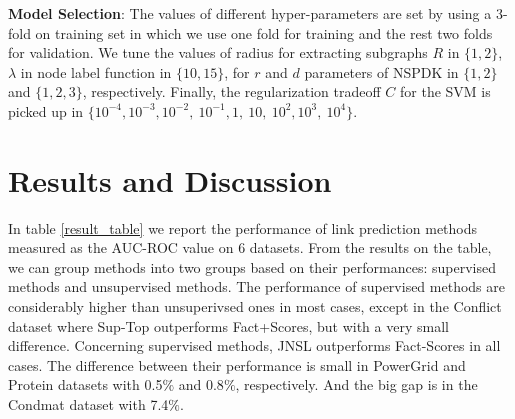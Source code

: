 \documentclass[runningheads,a4paper]{llncs}
\begin{document}
\textbf{Model Selection}: The values of different hyper-parameters are set by using a 3-fold on training set in which we use one fold for training and the rest two folds for validation. We tune the values of radius for extracting subgraphs $R$ in $\lbrace 1, 2 \rbrace$, $\lambda$ in node label function in $\lbrace 10, 15 \rbrace$, for $r$ and $d$ parameters of NSPDK in $\lbrace  1, 2 \rbrace$ and $\lbrace  1, 2, 3 \rbrace$, respectively. Finally, the regularization tradeoff $C$ for the SVM is picked up in $\lbrace 10^{-4}, 10^{-3}, 10^{-2},\ 10^{-1}, 1,\ 10,\ 10^2, 10^3,\ 10^4 \rbrace$.

\section{Results and Discussion}
In table \ref{result_table} we report the performance of link prediction methods measured as the AUC-ROC value on 6 datasets. From the results on the table, we can group methods into two groups based on their performances: supervised methods and unsupervised methods. The performance of supervised methods are considerably higher than unsuperivsed ones in most cases, except in the Conflict dataset where Sup-Top outperforms Fact+Scores, but with a very small difference. Concerning supervised methods, JNSL outperforms Fact-Scores in all cases. The difference between their performance is small in PowerGrid and Protein datasets with 0.5$\%$ and 0.8$\%$, respectively. And the big gap is in the Condmat dataset with 7.4$\%$. 
\end{document}
